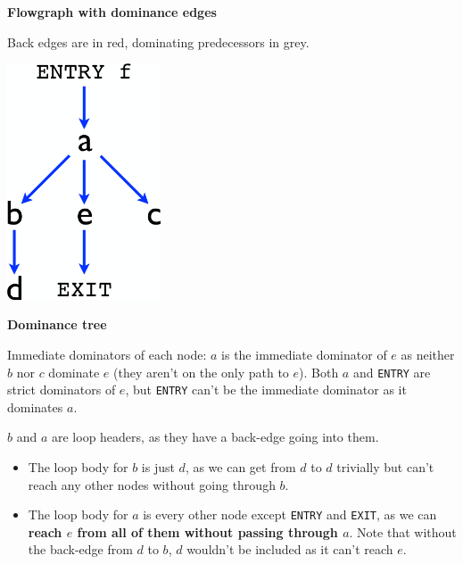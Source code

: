 \documentclass[a4paper, 11pt]{article}
\begin{document}
{\begin{minipage}[t]{0.47\textwidth}
    \textbf{Flowgraph with dominance edges}

    Back edges are in red, dominating predecessors in grey.
    \end{minipage}
    \hspace{5mm}
    \begin{minipage}[t]{0.47\textwidth}
    \centering
    \includegraphics[height=7cm]{dominator-tree.png}

    \textbf{Dominance tree}

    Immediate dominators of each node: \(a\) is the immediate dominator of \(e\) as neither \(b\) nor \(c\) dominate \(e\) (they aren't on the only path to \(e\)). Both \(a\) and \texttt{ENTRY} are strict dominators of \(e\), but \texttt{ENTRY} can't be the immediate dominator as it dominates \(a\).
    \end{minipage}

    \begin{minipage}[t]{0.47\textwidth}
    \vspace{10mm}
    \(b\) and \(a\) are loop headers, as they have a back-edge going into them.
    
    \begin{itemize}
    \item The loop body for \(b\) is just \(d\), as we can get from \(d\) to \(d\) trivially but can't reach any other nodes without going through \(b\).
    \item The loop body for \(a\) is every other node except \texttt{ENTRY} and \texttt{EXIT}, as we can \textbf{reach \(e\) from all of them without passing through \(a\)}. Note that without the back-edge from \(d\) to \(b\), \(d\) wouldn't be included as it can't reach \(e\).
    \end{itemize}

    \vspace{3mm}


\end{minipage}}
\end{document}

